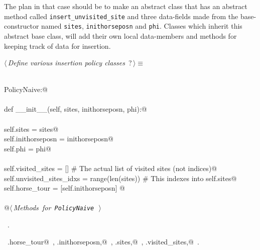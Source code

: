 \documentclass[11.5pt]{report}
\begin{document}
The plan in that case should be to make an abstract class that 
has an abstract method called \texttt{insert\_unvisited\_site}
and three data-fields made from the base-constructor named \texttt{sites}, \texttt{inithorseposn}
and \texttt{phi}. Classes which inherit this abstract base class, will 
add their own local data-members and methods for keeping track of 
data for insertion. 

\begin{flushleft} \small\label{scrap34}\raggedright\small
{} $\langle\,${\itshape Define various insertion policy classes}\nobreak\ {\footnotesize {?}}$\,\rangle\equiv$
\vspace{-1ex}
\begin{list}{}{} \item
\mbox{}\verb@@\\
\mbox{}\verb@class PolicyNaive:@\\
\mbox{}\verb@@\\
\mbox{}\verb@    def __init__(self, sites, inithorseposn, phi):@\\
\mbox{}\verb@@\\
\mbox{}\verb@         self.sites           = sites@\\
\mbox{}\verb@         self.inithorseposn   = inithorseposn@\\
\mbox{}\verb@         self.phi             = phi@\\
\mbox{}\verb@@\\
\mbox{}\verb@         self.visited_sites        = []                # The actual list of visited sites (not indices)@\\
\mbox{}\verb@         self.unvisited_sites_idxs = range(len(sites)) # This indexes into self.sites@\\
\mbox{}\verb@         self.horse_tour           = [self.inithorseposn]         @\\
\mbox{}\verb@@\\
\mbox{}\verb@    @\hbox{$\langle\,${\itshape Methods for \verb|PolicyNaive|}\nobreak\ {\footnotesize {}}$\,\rangle$}\verb@@\\
\mbox{}\verb@@{\NWsep}
\end{list}
\vspace{-1.5ex}
\footnotesize
\begin{list}{}{\setlength{\itemsep}{-\parsep}\setlength{\itemindent}{-\leftmargin}}
\item \NWtxtMacroRefIn\ .
\item \NWtxtIdentsDefed\nobreak\  \verb@self.horse_tour@\nobreak\ , \verb@self.inithorseposn,@\nobreak\ , \verb@self.sites,@\nobreak\ , \verb@self.visited_sites,@\nobreak\ .
\item{}
\end{list}
\vspace{4ex}
\end{flushleft}
\end{document}
